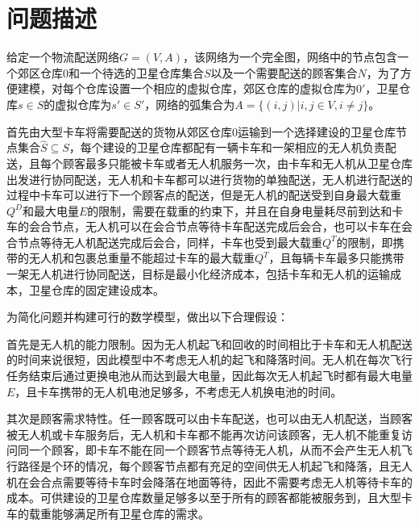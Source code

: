 \documentclass[fontset=none]{ctexart}
\begin{document}
\section{问题描述}


给定一个物流配送网络$G = (V, A)$，该网络为一个完全图，网络中的节点包含一个郊区仓库$0$和一个待选的卫星仓库集合$S$以及一个需要配送的顾客集合$N$，为了方便建模，对每个仓库设置一个相应的虚拟仓库，郊区仓库的虚拟仓库为$0'$，卫星仓库$s \in S$的虚拟仓库为$s' \in S'$，网络的弧集合为$A = \{(i,j)|i,j \in V, i \neq j\}$。

首先由大型卡车将需要配送的货物从郊区仓库$0$运输到一个选择建设的卫星仓库节点集合$\hat{S} \subseteq S$，每个建设的卫星仓库都配有一辆卡车和一架相应的无人机负责配送，且每个顾客最多只能被卡车或者无人机服务一次，由卡车和无人机从卫星仓库出发进行协同配送，无人机和卡车都可以进行货物的单独配送，无人机进行配送的过程中卡车可以进行下一个顾客点的配送，但是无人机的配送受到自身最大载重$Q^D$和最大电量$E$的限制，需要在载重的约束下，并且在自身电量耗尽前到达和卡车的会合节点，无人机可以在会合节点等待卡车配送完成后会合，也可以卡车在会合节点等待无人机配送完成后会合，同样，卡车也受到最大载重$Q^T$的限制，即携带的无人机和包裹总重量不能超过卡车的最大载重$Q^T$，且每辆卡车最多只能携带一架无人机进行协同配送，目标是最小化经济成本，包括卡车和无人机的运输成本，卫星仓库的固定建设成本。

为简化问题并构建可行的数学模型，做出以下合理假设：

首先是无人机的能力限制。因为无人机起飞和回收的时间相比于卡车和无人机配送的时间来说很短，因此模型中不考虑无人机的起飞和降落时间。无人机在每次飞行任务结束后通过更换电池从而达到最大电量，因此每次无人机起飞时都有最大电量$E$，且卡车携带的无人机电池足够多，不考虑无人机换电池的时间。

其次是顾客需求特性。任一顾客既可以由卡车配送，也可以由无人机配送，当顾客被无人机或卡车服务后，无人机和卡车都不能再次访问该顾客，无人机不能重复访问同一个顾客，即卡车不能在同一个顾客节点等待无人机，从而不会产生无人机飞行路径是个环的情况，每个顾客节点都有充足的空间供无人机起飞和降落，且无人机在会合点需要等待卡车时会降落在地面等待，因此不需要考虑无人机等待卡车的成本。可供建设的卫星仓库数量足够多以至于所有的顾客都能被服务到，且大型卡车的载重能够满足所有卫星仓库的需求。
\end{document}
